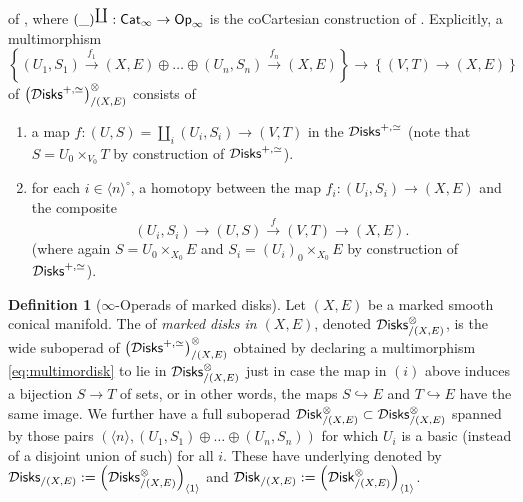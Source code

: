 \documentclass[10pt, reqno, twoside
, final
]{amsart}
\numberwithin{equation}{subsection}%
\theoremstyle{definition}
\newtheorem{defn}{Definition}[subsection]
\theoremstyle{definition}
\theoremstyle{definition}
\theoremstyle{definition}
\theoremstyle{definition}
\theoremstyle{definition}
\theoremstyle{definition}
\theoremstyle{definition}
\theoremstyle{definition}
\theoremstyle{plain}
\theoremstyle{definition}
\theoremstyle{plain}
\theoremstyle{definition}
\theoremstyle{plain}
\theoremstyle{definition}
\theoremstyle{definition}
\theoremstyle{plain}
\theoremstyle{plain}
\theoremstyle{definition}
\theoremstyle{plain}
\theoremstyle{plain}
\theoremstyle{plain}
\begin{document}
of \infopst, where $(\_)^{\coprod}:\mathsf{Cat}_{\infty}\rightarrow \mathsf{Op}_{\infty}$ is the coCartesian \infop construction of \cite[Section 2.4.3]{LurHA}. Explicitly, a multimorphism
\begin{equation}\label{eq:multimordisk}  \left\{(U_1,S_1)\overset{f_1}{\rightarrow} (X,E)\oplus\ldots \oplus (U_n,S_n)\overset{f_n}{\rightarrow} (X,E)\right\} \longrightarrow \left\{(V,T)\rightarrow (X,E)\right\}\end{equation}
of $\left(\mathcal{D}\mathsf{isks}^{+,\simeq}\right)_{/(X,E)}^{\otimes}$ consists of 
\begin{enumerate}[$(i)$]
    \item a map $f:(U,S) = \coprod_i(U_i,S_i)\rightarrow (V,
    T)$ in the \infcat $\mathcal{D}\mathsf{isks}^{+,\simeq}$ (note that $S=U_0\times_{V_0}T$ by construction of $\mathcal{D}\mathsf{isks}^{+,\simeq}$).
    \item for each $i\in \langle n\rangle^{\circ}$, a homotopy between the map $f_i:(U_i,S_i)\rightarrow (X,E)$ and the composite
    \[  (U_i,S_i)\longrightarrow (U,S)\overset{f}{\longrightarrow} (V,T)\longrightarrow (X,E). \]
    (where again $S=U_0\times_{X_0}E$ and $S_i=(U_i)_0\times_{X_0}E$ by construction of $\mathcal{D}\mathsf{isks}^{+,\simeq}$).
\end{enumerate}




\begin{defn}[$\infty$-Operads of marked disks]
Let $(X,E)$ be a marked smooth conical manifold. The \infop of \emph{marked disks in $(X,E)$}, denoted $\mathcal{D}\mathsf{isks}^{\otimes}_{/(X,E)}$, is the wide suboperad of  $\left(\mathcal{D}\mathsf{isks}^{+,\simeq}\right)_{/(X,E)}^{\otimes}$ obtained by declaring a multimorphism \eqref{eq:multimordisk} to lie in $\mathcal{D}\mathsf{isks}^{\otimes}_{/(X,E)}$ just in case the map in $(i)$ above induces a bijection $S\rightarrow T$ of sets, or in other words, the maps $S\hookrightarrow E$ and $T\hookrightarrow E$ have the same image. We further have a full suboperad $\mathcal{D}\mathsf{isk}^{\otimes}_{/(X,E)}\subset \mathcal{D}\mathsf{isks}^{\otimes}_{/(X,E)}$ spanned by those pairs $\left(\langle n\rangle, (U_1,S_1)\oplus \ldots \oplus  (U_n,S_n)\right)$ for which $U_i$ is a basic (instead of a disjoint union of such) for all $i$. These \infops have underlying \infcats denoted by $\mathcal{D}\mathsf{isks}_{/(X,E)}:=\left(\mathcal{D}\mathsf{isks}^{\otimes}_{/(X,E)}\right)_{\langle 1\rangle}$ and $\mathcal{D}\mathsf{isk}_{/(X,E)}:=\left(\mathcal{D}\mathsf{isk}^{\otimes}_{/(X,E)}\right)_{\langle 1\rangle}$.    
\end{defn}
\end{document}
